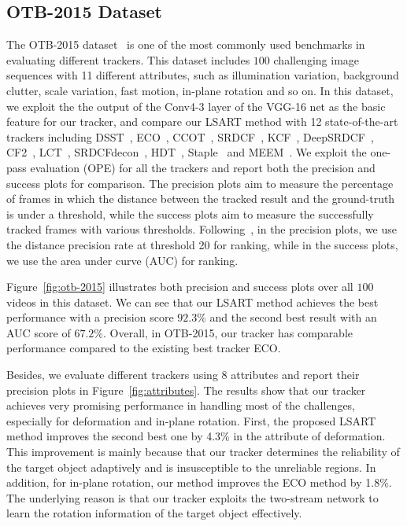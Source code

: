 \documentclass[10pt,twocolumn,letterpaper]{article}
\begin{document}
\subsection{OTB-2015 Dataset}
The OTB-2015 dataset~\cite{wu2015object} is one of the most commonly used
benchmarks in evaluating different trackers. This dataset includes $100$ challenging image
sequences with 11 different attributes, such as illumination variation, background clutter,
scale variation, fast motion, in-plane rotation and so on.
In this dataset, we exploit the the output of the Conv4-3 layer
of the VGG-16 net as the basic feature for our tracker, and compare our LSART method with 12 state-of-the-art trackers including DSST~\cite{danelljan2014accurate},
ECO~\cite{danelljan2016eco}, CCOT~\cite{danelljan2016beyond}, SRDCF~\cite{danelljan2015learning}, KCF~\cite{henriques2015high},
DeepSRDCF~\cite{danelljan2015convolutional}, CF2~\cite{ma2015hierarchical}, LCT~\cite{ma2015long},
SRDCFdecon~\cite{danelljan2016adaptive},  HDT~\cite{qi2016hedged},  Staple~\cite{bertinetto2016staple} and MEEM~\cite{zhang2014meem}.
We exploit the one-pass evaluation (OPE) for all the trackers and report both the precision and success plots for comparison.
The precision plots aim to measure the percentage of frames in which the distance between the tracked result and the ground-truth
is under a threshold, while the success plots aim to measure the successfully tracked frames with various thresholds.
Following~\cite{WuLimYang13}, in the precision plots, we use the distance precision rate at threshold 20 for ranking,
while in the success plots, we use the area under curve (AUC) for ranking.

Figure~\ref{fig:otb-2015} illustrates both precision and success plots over all $100$ videos in this dataset.
We can see that our LSART method achieves the best performance with a precision score $92.3\%$
and the second best result with an AUC score of $67.2\%$.
Overall, in OTB-2015, our tracker has comparable performance compared to the existing best tracker
ECO.

Besides, we evaluate different trackers using 8 attributes and report their precision plots
in Figure~\ref{fig:attributes}.
The results show that our tracker achieves very promising performance in handling most of the challenges,
especially for deformation and in-plane rotation.
First, the proposed LSART method improves the second best one by 4.3\% in the attribute of deformation.
This improvement is mainly because that our tracker determines the reliability of the target object adaptively
and is insusceptible to the unreliable regions.
In addition, for in-plane rotation, our method improves the ECO method by 1.8\%. The underlying reason is that
our tracker exploits the two-stream network to learn the rotation information of the target object effectively.
\end{document}
